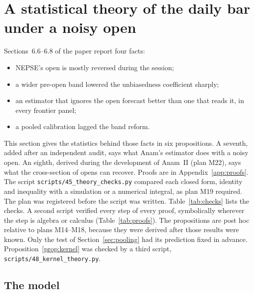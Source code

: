 \section{A statistical theory of the daily bar under a noisy open}\label{sec:theory}

Sections~6.6--6.8 of the paper report four facts:
\begin{itemize}
  \item NEPSE's open is mostly reversed during the session;
  \item a wider pre-open band lowered the unbiasedness coefficient sharply;
  \item an estimator that ignores the open forecast better than one that reads it, in every
        frontier panel;
  \item a pooled calibration lagged the band reform.
\end{itemize}
This section gives the statistics behind those facts in six propositions. A seventh,
added after an independent audit, says what Anam's estimator does with a noisy open. An eighth, derived
during the development of Anam~II (plan M22), says what the cross-section of opens can recover. Proofs are in
Appendix~\ref{app:proofs}. The script \texttt{scripts/45\_theory\_checks.py} compared each closed
form, identity and inequality with a simulation or a numerical integral, as plan M19 required. The
plan was registered before the script was written. Table~\ref{tab:checks} lists the checks. A second
script verified every step of every proof, symbolically wherever the step is algebra or calculus
(Table~\ref{tab:proofs}). The
propositions are post hoc relative to plans M14--M18, because they were derived after those
results were known. Only the test of Section~\ref{sec:pooling} had its prediction fixed in advance.
Proposition~\ref{prop:kernel} was checked by a third script, \texttt{scripts/48\_kernel\_theory.py}.

\subsection{The model}\label{sec:model}

